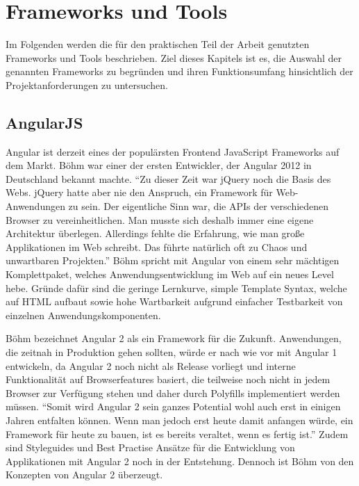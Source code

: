 
\chapter{Frameworks und Tools}
\label{chap:frameworks}

Im Folgenden werden die für den praktischen Teil der Arbeit genutzten Frameworks und Tools beschrieben.
Ziel dieses Kapitels ist es, die Auswahl der genannten Frameworks zu begründen und
ihren Funktionsumfang hinsichtlich der Projektanforderungen zu untersuchen.

\section{AngularJS}

Angular ist derzeit eines der populärsten Frontend JavaScript Frameworks auf dem Markt.
Böhm war einer der ersten Entwickler, der Angular 2012 in Deutschland bekannt machte.
``Zu dieser Zeit war jQuery noch die Basis des Webs. jQuery hatte aber nie den Anspruch, ein Framework für Web-Anwendungen zu sein. Der eigentliche Sinn war, die APIs der verschiedenen Browser zu vereinheitlichen.
Man musste sich deshalb immer eine eigene Architektur überlegen. Allerdings fehlte die Erfahrung, wie man große Applikationen im Web schreibt. Das führte natürlich oft zu Chaos und unwartbaren Projekten.''\cite{Angu68:online}
Böhm spricht mit Angular von einem sehr mächtigen Komplettpaket, welches Anwendungsentwicklung im Web auf ein neues Level hebe.
Gründe dafür sind die geringe Lernkurve, simple Template Syntax,
welche auf \ac{HTML} aufbaut sowie hohe Wartbarkeit aufgrund einfacher Testbarkeit von einzelnen Anwendungskomponenten.

Böhm bezeichnet Angular 2 als ein Framework für die Zukunft.
Anwendungen, die zeitnah in Produktion gehen sollten, würde er nach wie vor mit Angular 1 entwickeln,
da Angular 2 noch nicht als Release vorliegt und interne Funktionalität auf Browserfeatures basiert,
die teilweise noch nicht in jedem Browser zur Verfügung stehen und daher durch Polyfills implementiert werden müssen.
``Somit wird Angular 2 sein ganzes Potential wohl auch erst in einigen Jahren entfalten können.
Wenn man jedoch erst heute damit anfangen würde, ein Framework für heute zu bauen,
ist es bereits veraltet, wenn es fertig ist.''\cite{Angu68:online}
Zudem sind Styleguides und Best Practise Ansätze für die Entwicklung von Applikationen mit Angular 2
noch in der Entstehung.
Dennoch ist Böhm von den Konzepten von Angular 2 überzeugt.


